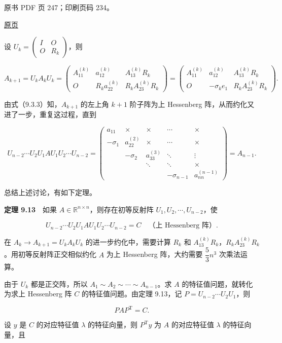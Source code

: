 \clearpage

原书 PDF 页 247；印刷页码 234。

\href{source-images/pdf-247.jpeg}{原页}

设 \(U_k=\begin{pmatrix}I&O\\O&R_k\end{pmatrix}\)，则

\[
A_{k+1}=U_kA_kU_k=
\begin{pmatrix}
A_{11}^{(k)}&a_{12}^{(k)}&A_{13}^{(k)}R_k\\
O&R_ka_{22}^{(k)}&R_kA_{23}^{(k)}R_k
\end{pmatrix}
=
\begin{pmatrix}
A_{11}^{(k)}&a_{12}^{(k)}&A_{13}^{(k)}R_k\\
O&-\sigma_ke_1&R_kA_{23}^{(k)}R_k
\end{pmatrix}.
\tag{9.3.3}
\]

由式（9.3.3）知，\(A_{k+1}\) 的左上角 \(k+1\) 阶子阵为上 Hessenberg 阵，从而约化又进了一步，重复这过程，直到

\[
U_{n-2}\cdots U_2U_1AU_1U_2\cdots U_{n-2}
=\begin{pmatrix}
a_{11}&\times&\times&\cdots&\times\\
-\sigma_1&a_{22}^{(2)}&\times&\cdots&\times\\
&-\sigma_2&a_{33}^{(3)}&\ddots&\vdots\\
&&\ddots&\ddots&\times\\
&&&-\sigma_{n-1}&a_{nn}^{(n-1)}
\end{pmatrix}=A_{n-1}.
\]

总结上述讨论，有如下定理。

\textbf{定理 9.13}　如果 \(A\in\mathbb R^{n\times n}\)，则存在初等反射阵 \(U_1,U_2,\cdots,U_{n-2}\)，使

\[
U_{n-2}\cdots U_2U_1AU_1U_2\cdots U_{n-2}=C\quad\text{（上 Hessenberg 阵）}.
\]

在 \(A_k\to A_{k+1}=U_kA_kU_k\) 的进一步约化中，需要计算 \(R_k\) 和 \(A_{13}^{(k)}R_k\)，\(R_kA_{23}^{(k)}R_k\)。用初等反射阵正交相似约化 \(A\) 为上 Hessenberg 阵，大约需要 \(\dfrac53n^3\) 次乘法运算。

由于 \(U_k\) 都是正交阵，所以 \(A_1\sim A_2\sim\cdots\sim A_{n-1}\)。求 \(A\) 的特征值问题，就转化为求上 Hessenberg 阵 \(C\) 的特征值问题。由定理 9.13，记 \(P=U_{n-2}\cdots U_2U_1\)，则

\[
PAP^{\mathrm T}=C.
\]

设 \(y\) 是 \(C\) 的对应特征值 \(\lambda\) 的特征向量，则 \(P^{\mathrm T}y\) 为 \(A\) 的对应特征值 \(\lambda\) 的特征向量，且

